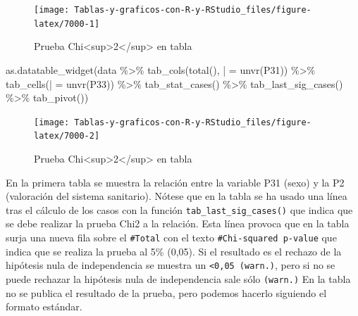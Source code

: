 \documentclass[
]{book}
\newenvironment{Shaded}{\begin{snugshade}}{\end{snugshade}}
\newcommand{\AttributeTok}[1]{\textcolor[rgb]{0.77,0.63,0.00}{#1}}
\newcommand{\FunctionTok}[1]{\textcolor[rgb]{0.00,0.00,0.00}{#1}}
\newcommand{\NormalTok}[1]{#1}
\newcommand{\OtherTok}[1]{\textcolor[rgb]{0.56,0.35,0.01}{#1}}
\newcommand{\SpecialCharTok}[1]{\textcolor[rgb]{0.00,0.00,0.00}{#1}}
\newcommand{\StringTok}[1]{\textcolor[rgb]{0.31,0.60,0.02}{#1}}
\begin{document}
\begin{figure}[H]

{\centering \texttt{[image: Tablas-y-graficos-con-R-y-RStudio\_files/figure-latex/7000-1]} 

}

\caption{Prueba Chi<sup>2</sup> en tabla}\label{fig:7000}
\end{figure}

\begin{Shaded}
\begin{Highlighting}[]
\FunctionTok{as.datatable\_widget}\NormalTok{(data }\SpecialCharTok{\%\textgreater{}\%}
  \FunctionTok{tab\_cols}\NormalTok{(}\FunctionTok{total}\NormalTok{(), }\StringTok{\textasciigrave{}}\AttributeTok{|}\StringTok{\textasciigrave{}} \OtherTok{=} \FunctionTok{unvr}\NormalTok{(P31)) }\SpecialCharTok{\%\textgreater{}\%}
  \FunctionTok{tab\_cells}\NormalTok{(}\StringTok{\textasciigrave{}}\AttributeTok{|}\StringTok{\textasciigrave{}} \OtherTok{=} \FunctionTok{unvr}\NormalTok{(P33)) }\SpecialCharTok{\%\textgreater{}\%}
  \FunctionTok{tab\_stat\_cases}\NormalTok{() }\SpecialCharTok{\%\textgreater{}\%}
  \FunctionTok{tab\_last\_sig\_cases}\NormalTok{() }\SpecialCharTok{\%\textgreater{}\%}
  \FunctionTok{tab\_pivot}\NormalTok{())}
\end{Highlighting}
\end{Shaded}

\begin{figure}[H]

{\centering \texttt{[image: Tablas-y-graficos-con-R-y-RStudio\_files/figure-latex/7000-2]} 

}

\caption{Prueba Chi<sup>2</sup> en tabla}\label{fig:7000}
\end{figure}

En la primera tabla se muestra la relación entre la variable P31 (sexo) y la P2 (valoración del sistema sanitario). Nótese que en la tabla se ha usado una línea tras el cálculo de los casos con la función \texttt{tab\_last\_sig\_cases()} que indica que se debe realizar la prueba Chi2 a la relación. Esta línea provoca que en la tabla surja una nueva fila sobre el \texttt{\#Total} con el texto \texttt{\#Chi-squared\ p-value} que indica que se realiza la prueba al 5\% (0,05). Si el resultado es el rechazo de la hipótesis nula de independencia se muestra un \texttt{\textless{}0,05\ (warn.)}, pero si no se puede rechazar la hipótesis nula de independencia sale sólo \texttt{(warn.)} En la tabla no se publica el resultado de la prueba, pero podemos hacerlo siguiendo el formato estándar.
\end{document}
